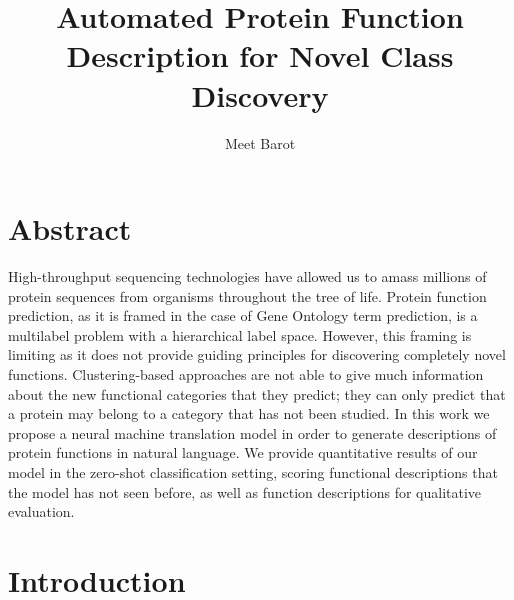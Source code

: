\documentclass{specification}
\title{Automated Protein Function Description for Novel Class Discovery}
\author{Meet Barot}
\begin{document}
\maketitle

\section{Abstract}
High-throughput sequencing technologies have allowed us to amass millions of protein sequences from organisms throughout the tree of life.
Protein function prediction, as it is framed in the case of Gene Ontology term prediction, is a multilabel problem with a hierarchical label space.
However, this framing is limiting as it does not provide guiding principles for discovering completely novel functions.
Clustering-based approaches are not able to give much information about the new functional categories that they predict; they can only predict that a protein may belong to a category that has not been studied.
In this work we propose a neural machine translation model in order to generate descriptions of protein functions in natural language.
We provide quantitative results of our model in the zero-shot classification setting, scoring functional descriptions that the model has not seen before, as well as function descriptions for qualitative evaluation.

\section{Introduction}
\end{document}
